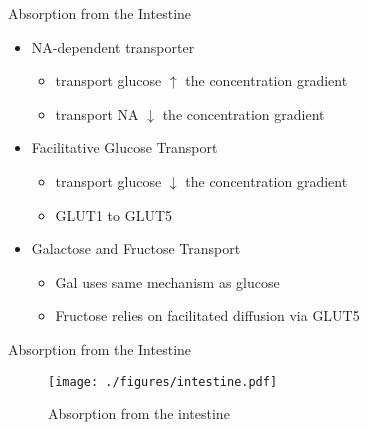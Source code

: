 \documentclass[presentation, smaller]{beamer}
\begin{document}
\begin{frame}[label={sec:org22ab28d}]{Absorption from the Intestine}
\begin{itemize}
\item NA-dependent transporter
\begin{itemize}
\item transport glucose \(\uparrow\) the concentration gradient
\item transport NA \(\downarrow\) the concentration gradient
\end{itemize}
\item Facilitative Glucose Transport
\begin{itemize}
\item transport glucose \(\downarrow\) the concentration gradient
\item GLUT1 to GLUT5
\end{itemize}
\item Galactose and Fructose Transport
\begin{itemize}
\item Gal uses same mechanism as glucose
\item Fructose relies on facilitated diffusion via GLUT5
\end{itemize}
\end{itemize}
\end{frame}

\begin{frame}[label={sec:org12ae2da}]{Absorption from the Intestine}
\begin{figure}[htbp]
\centering
\texttt{[image: ./figures/intestine.pdf]}
\caption{\label{fig:org40504eb}
Absorption from the intestine}
\end{figure}
\end{frame}
\end{document}
